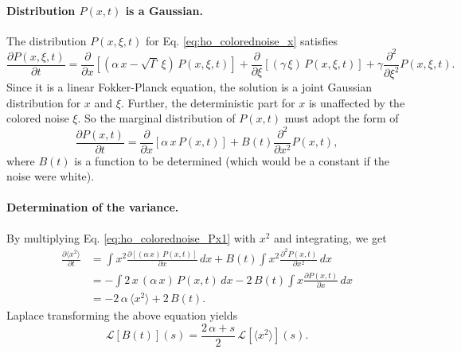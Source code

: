 \documentclass{article}
\begin{document}
\paragraph{Distribution $P(x, t)$ is a Gaussian.}

The distribution $P(x, \xi, t)$ for
Eq. \eqref{eq:ho_colorednoise_x} satisfies
$$
\frac{ \partial P(x, \xi, t) } { \partial t }
=
\frac{ \partial } { \partial x }
\left[
  \left(\alpha \, x - \sqrt{\Gamma} \, \xi \right) \, P(x, \xi, t)
\right]
+
\frac{ \partial } { \partial \xi }
\left[
  (\gamma \, \xi ) \, P(x, \xi, t)
\right]
+
\gamma
\frac{ \partial^2 } { \partial \xi^2} P(x, \xi, t).
$$
Since it is a linear Fokker-Planck equation,
the solution is a joint Gaussian distribution
for $x$ and $\xi$.
%
Further, the deterministic part for $x$
is unaffected by the colored noise $\xi$.
%
So the marginal distribution of $P(x, t)$
must adopt the form of
\begin{equation}
\frac{ \partial P(x, t) } { \partial t }
=
\frac{ \partial } { \partial x }
\left[
  \alpha \, x \, P(x, t)
\right]
+
B(t)
\frac{ \partial^2 } { \partial x^2} P(x, t),
\label{eq:ho_colorednoise_Px1}
\end{equation}
where $B(t)$
is a function to be determined
(which would be a constant if the noise were white).

\paragraph{Determination of the variance.}

By multiplying Eq. \eqref{eq:ho_colorednoise_Px1} with $x^2$ and integrating,
we get
$$
\begin{aligned}
\frac{ \partial \langle x^2 \rangle } { \partial t }
&=
\int x^2 \frac{ \partial [(\alpha \, x) \, P(x, t) ] } { \partial x} \, dx
+ B(t) \int x^2 \frac{ \partial^2 P(x, t) } { \partial x^2 } \, dx
\\
&=
-\int 2 \, x \, (\alpha \, x) \, P(x, t) \, dx
- 2 \, B(t) \int x \frac{ \partial P(x, t) } { \partial x } \, dx
\\
&=
- 2 \, \alpha \, \langle x^2 \rangle
+ 2 \, B(t).
\end{aligned}
$$
Laplace transforming the above equation yields
\begin{equation}
\mathcal L[ B(t) ](s) = \frac{2 \, \alpha + s}{2} \, \mathcal L[\langle x^2 \rangle](s).
\label{eq:Laplace_B_x^2}
\end{equation}
\end{document}

